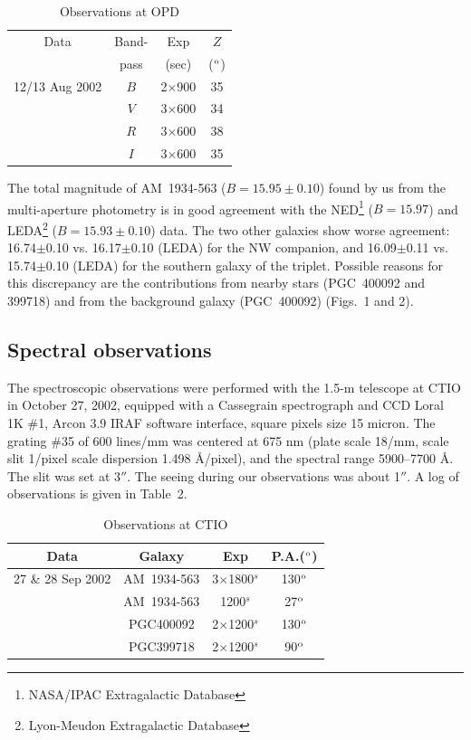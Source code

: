 \documentclass[]{aa}
\begin{document}
\begin{table}
\centering
\begin{tabular}{cccc}
\hline
\hline
 Data & Band-        & Exp &  $Z$     \\
      & pass         & (sec)& ($^{\rm o}$) \\
\hline                   
12/13 Aug 2002 & $B$ & 2$\times$900 & 35   \\
               & $V$ & 3$\times$600 & 34     \\
               & $R$ & 3$\times$600 & 38   \\
               & $I$ & 3$\times$600 & 35     \\	       
\hline
\end{tabular}
\caption{Observations at OPD}
\end{table}

The total magnitude of AM~1934-563 ($B=15.95\pm0.10$) found by us 
from the multi-aperture photometry is in good agreement with the 
NED\footnote{NASA/IPAC Extragalactic Database} ($B=15.97$) and 
LEDA\footnote{Lyon-Meudon Extragalactic Database} 
($B=15.93\pm0.10$) data. The two other galaxies show worse
agreement: 16.74$\pm$0.10 vs. 16.17$\pm$0.10 (LEDA) for the NW
companion, and 16.09$\pm$0.11 vs. 15.74$\pm$0.10 (LEDA) for
the southern galaxy of the triplet. Possible reasons for this
discrepancy are the contributions from nearby stars (PGC~400092 and
399718) and from the background galaxy (PGC~400092) (Figs.~1 and 2).
 
\subsection{Spectral observations}

The spectroscopic observations were performed with the 1.5-m 
telescope at CTIO in October 27, 2002, equipped with a Cassegrain 
spectrograph and CCD Loral 1K \#1, Arcon 3.9 IRAF software interface, 
square pixels size 15 micron. The grating \#35 of 600 lines/mm was 
centered at 675 nm (plate scale 18/mm, scale slit 1/pixel 
scale dispersion 1.498 \AA/pixel), and the spectral range 5900--7700 \AA.
The slit was set at 3$''$. The seeing during our observations was 
about 1$''$. A log of observations is given in Table~2. 

\begin{table}
\centering
\begin{tabular}{cccc}
\hline
\hline
 Data & Galaxy       & Exp &  P.A.($^{\rm o}$)     \\
\hline                   
27 \& 28 Sep 2002 & AM~1934-563 & 3$\times$1800$^s$ & 130$^{\rm o}$   \\
                   & AM~1934-563 & 1200$^s$ &  27$^{\rm o}$   \\
                   & PGC400092    & 2$\times$1200$^s$ & 130$^{\rm o}$   \\
                   & PGC399718    & 2$\times$1200$^s$ & 90$^{\rm o}$ \\	       
\hline
\end{tabular}
\caption{Observations at CTIO}
\end{table}
\end{document}
